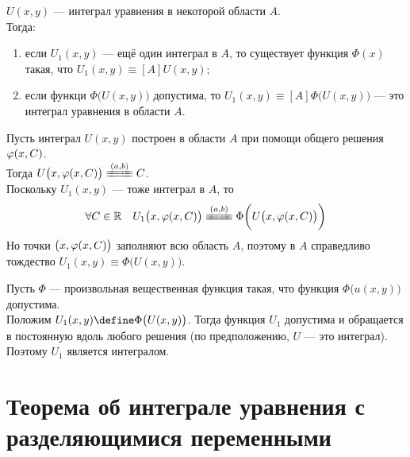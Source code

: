\begin{theorem}
    $ U(x, y) $ --- интеграл уравнения  в некоторой области $ A $. \\
    Тогда:
    \begin{enumerate}
    	\item если $ U_1(x, y) $ --- ещё один интеграл в $ A $, то существует функция $ \Phi(x) $ такая, что $ U_1(x, y) \equiv[A] U(x, y) $;
        \item если функци $ \Phi \big( U(x, y) \big) $ допустима, то $ U_1(x, y) \equiv[A] \Phi \big( U(x, y) \big) $ --- это интеграл уравнения  в области $ A $.
    \end{enumerate}
\end{theorem}

\begin{eproof}
	\item Пусть интеграл $ U(x, y) $ построен в области $ A $ при помощи общего решения $ \varphi(x, C) $. \\
    Тогда $ U \big( x, \vphi(x, C) \big) \equiv[(a, b)] C $. \\
	Поскольку $ U_1(x, y) $ --- тоже интеграл в $ A $, то
	$$ \forall C \in \R \quad U_1 \big( x, \vphi(x, C) \big) \equiv[(a, b)] \Phi \bigg( U \big( x, \vphi(x, C) \big) \bigg) $$
	Но точки $ \big(x, \varphi(x, C) \big) $ заполняют всю область $ A $, поэтому в $ A $ справедливо тождество $ U_1(x, y) \equiv \Phi \big( U(x, y) \big) $.

	\item Пусть $ \Phi $ --- произвольная вещественная функция такая, что функция $ \Phi \big( u(x, y) \big) $ допустима. \\
	Положим $ U_1(x, y) \define \Phi \big( U(x, y) \big) $. Тогда функция $ U_1 $ допустима и обращается в постоянную вдоль любого решения (\as по предположению, $ U $ --- это интеграл). Поэтому $ U_1 $ является интегралом.
\end{eproof}

\section{Теорема об интеграле уравнения с разделяющимися переменными}

